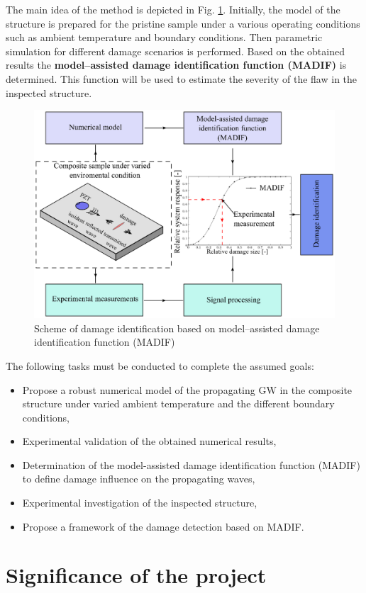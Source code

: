 \documentclass[a4paper,12pt]{article}
\begin{document}
The main idea of the method is depicted in Fig. \ref{fig:scheme}. Initially, the model of the structure is prepared for the pristine sample under a various operating conditions such as ambient temperature and boundary conditions. Then parametric simulation for different damage scenarios is performed. Based on the obtained results the \textbf{model--assisted damage identification function (MADIF)} is determined. This function will be used to estimate the severity of the flaw in the inspected structure.
\begin{figure}
\includegraphics[width=1\textwidth]{../Figures/scheme.eps}
	\caption{Scheme of damage identification based on model--assisted damage identification function (MADIF)}
	\label{fig:scheme}
\end{figure}
The following tasks must be conducted to complete the assumed goals: 
\begin{itemize}
	\item Propose a robust numerical model of the propagating GW in the composite structure under varied ambient temperature and the different boundary conditions,
	\item Experimental validation of the obtained numerical results,
  \item Determination of the model-assisted damage identification function (MADIF) to define damage influence on the propagating waves,
	\item Experimental investigation of the inspected structure,
	\item Propose a framework of the damage detection based on MADIF.
\end{itemize}
\section{Significance of the project}
\end{document}
